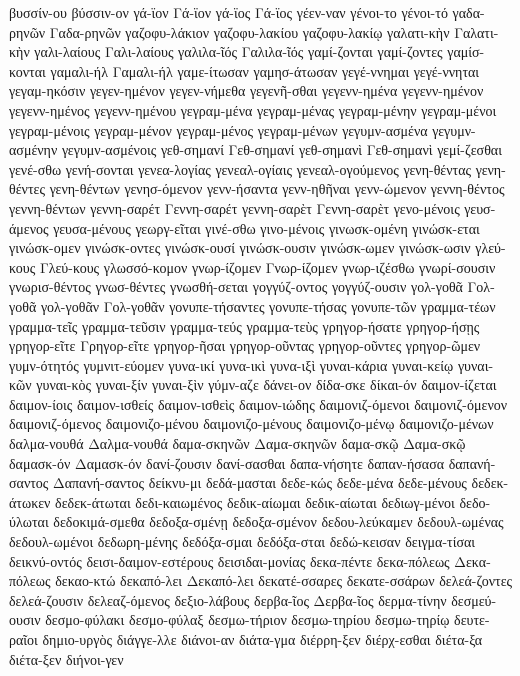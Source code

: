 {βυσσίν-ου
βύσσιν-ον
γά-ϊον
Γά-ϊον
γά-ϊος
Γά-ϊος
γέεν-ναν
γένοι-το
γένοι-τό
γαδα-ρηνῶν
Γαδα-ρηνῶν
γαζοφυ-λάκιον
γαζοφυ-λακίου
γαζοφυ-λακίῳ
γαλατι-κὴν
Γαλατι-κὴν
γαλι-λαίους
Γαλι-λαίους
γαλιλα-ῖός
Γαλιλα-ῖός
γαμί-ζονται
γαμί-ζοντες
γαμίσ-κονται
γαμαλι-ήλ
Γαμαλι-ήλ
γαμε-ίτωσαν
γαμησ-άτωσαν
γεγέ-ννημαι
γεγέ-ννηται
γεγαμ-ηκόσιν
γεγεν-ημένον
γεγεν-νήμεθα
γεγενῆ-σθαι
γεγενν-ημένα
γεγενν-ημένον
γεγενν-ημένος
γεγενν-ημένου
γεγραμ-μένα
γεγραμ-μένας
γεγραμ-μένην
γεγραμ-μένοι
γεγραμ-μένοις
γεγραμ-μένον
γεγραμ-μένος
γεγραμ-μένων
γεγυμν-ασμένα
γεγυμν-ασμένην
γεγυμν-ασμένοις
γεθ-σημανί
Γεθ-σημανί
γεθ-σημανὶ
Γεθ-σημανὶ
γεμί-ζεσθαι
γενέ-σθω
γενή-σονται
γενεα-λογίας
γενεαλ-ογίαις
γενεαλ-ογούμενος
γενη-θέντας
γενη-θέντες
γενη-θέντων
γενησ-όμενον
γενν-ήσαντα
γενν-ηθῆναι
γενν-ώμενον
γεννη-θέντος
γεννη-θέντων
γεννη-σαρέτ
Γεννη-σαρέτ
γεννη-σαρὲτ
Γεννη-σαρὲτ
γενο-μένοις
γευσ-άμενος
γευσα-μένους
γεωργ-εῖται
γινέ-σθω
γινο-μένοις
γινωσκ-ομένη
γινώσκ-εται
γινώσκ-ομεν
γινώσκ-οντες
γινώσκ-ουσί
γινώσκ-ουσιν
γινώσκ-ωμεν
γινώσκ-ωσιν
γλεύ-κους
Γλεύ-κους
γλωσσό-κομον
γνωρ-ίζομεν
Γνωρ-ίζομεν
γνωρ-ιζέσθω
γνωρί-σουσιν
γνωρισ-θέντος
γνωσ-θέντες
γνωσθή-σεται
γογγύζ-οντος
γογγύζ-ουσιν
γολ-γοθᾶ
Γολ-γοθᾶ
γολ-γοθᾶν
Γολ-γοθᾶν
γονυπε-τήσαντες
γονυπε-τήσας
γονυπε-τῶν
γραμμα-τέων
γραμμα-τεῖς
γραμμα-τεῦσιν
γραμμα-τεύς
γραμμα-τεὺς
γρηγορ-ήσατε
γρηγορ-ήσῃς
γρηγορ-εῖτε
Γρηγορ-εῖτε
γρηγορ-ῆσαι
γρηγορ-οῦντας
γρηγορ-οῦντες
γρηγορ-ῶμεν
γυμν-ότητός
γυμνιτ-εύομεν
γυνα-ικί
γυνα-ικὶ
γυνα-ιξὶ
γυναι-κάρια
γυναι-κείῳ
γυναι-κῶν
γυναι-κὸς
γυναι-ξίν
γυναι-ξὶν
γύμν-αζε
δάνει-ον
δίδα-σκε
δίκαι-όν
δαιμον-ίζεται
δαιμον-ίοις
δαιμον-ισθείς
δαιμον-ισθεὶς
δαιμον-ιώδης
δαιμονιζ-όμενοι
δαιμονιζ-όμενον
δαιμονιζ-όμενος
δαιμονιζο-μένου
δαιμονιζο-μένους
δαιμονιζο-μένῳ
δαιμονιζο-μένων
δαλμα-νουθά
Δαλμα-νουθά
δαμα-σκηνῶν
Δαμα-σκηνῶν
δαμα-σκῷ
Δαμα-σκῷ
δαμασκ-όν
Δαμασκ-όν
δανί-ζουσιν
δανί-σασθαι
δαπα-νήσητε
δαπαν-ήσασα
δαπανή-σαντος
Δαπανή-σαντος
δείκνυ-μι
δεδά-μασται
δεδε-κώς
δεδε-μένα
δεδε-μένους
δεδεκ-άτωκεν
δεδεκ-άτωται
δεδι-καιωμένος
δεδικ-αίωμαι
δεδικ-αίωται
δεδιωγ-μένοι
δεδο-ύλωται
δεδοκιμά-σμεθα
δεδοξα-σμένῃ
δεδοξα-σμένον
δεδου-λεύκαμεν
δεδουλ-ωμένας
δεδουλ-ωμένοι
δεδωρη-μένης
δεδόξα-σμαι
δεδόξα-σται
δεδώ-κεισαν
δειγμα-τίσαι
δεικνύ-οντός
δεισι-δαιμον-εστέρους
δεισιδαι-μονίας
δεκα-πέντε
δεκα-πόλεως
Δεκα-πόλεως
δεκαο-κτώ
δεκαπό-λει
Δεκαπό-λει
δεκατέ-σσαρες
δεκατε-σσάρων
δελεά-ζοντες
δελεά-ζουσιν
δελεαζ-όμενος
δεξιο-λάβους
δερβα-ῖος
Δερβα-ῖος
δερμα-τίνην
δεσμεύ-ουσιν
δεσμο-φύλακι
δεσμο-φύλαξ
δεσμω-τήριον
δεσμω-τηρίου
δεσμω-τηρίῳ
δευτε-ραῖοι
δημιο-υργὸς
διάγγε-λλε
διάνοι-αν
διάτα-γμα
διέρρη-ξεν
διέρχ-εσθαι
διέτα-ξα
διέτα-ξεν
διήνοι-γεν
}
